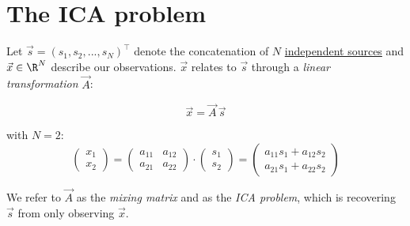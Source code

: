 
\section{The ICA problem}

\begin{frame}{\secname}

Let $\vec s = (s_1, s_2,...,s_N)^\top$ denote the concatenation of $N$ \underline{independent sources} 
and $\vec x \in \R^N$ describe our observations. $\vec x$ relates to $\vec s$ through a 
\emph{linear transformation} $\vec A$:

\begin{equation}
\label{eq:ica}
\vec x = \vec A \, \vec s
\end{equation}

with $N=2$:
\begin{equation}
 \left( \begin{array}{ll}
			x_1 \\ x_2
		\end{array} \right)
        = \left( \begin{array}{ll}
			a_{11} & a_{12} \\ a_{21} & a_{22}
		\end{array} \right) \cdot \left( \begin{array}{ll}
			s_1 \\ s_2
		\end{array} \right)
	= \left( \begin{array}{l}
		a_{11} s_1 + a_{12} s_2 \\ a_{21} s_1 + a_{22} s_2
	\end{array} \right)
\end{equation}

We refer to $\vec A$ as the \emph{mixing matrix} and \notesonly{\eqref{eq:ica}} as the \emph{ICA problem}, 
which is recovering $\vec s$ from only observing $\vec x$.

\end{frame}

